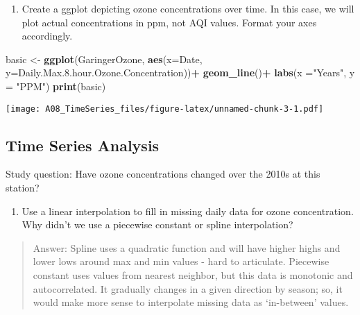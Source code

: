 \documentclass[
]{article}
\newenvironment{Shaded}{\begin{snugshade}}{\end{snugshade}}
\newcommand{\DataTypeTok}[1]{\textcolor[rgb]{0.13,0.29,0.53}{#1}}
\newcommand{\FloatTok}[1]{\textcolor[rgb]{0.00,0.00,0.81}{#1}}
\newcommand{\KeywordTok}[1]{\textcolor[rgb]{0.13,0.29,0.53}{\textbf{#1}}}
\newcommand{\NormalTok}[1]{#1}
\newcommand{\OperatorTok}[1]{\textcolor[rgb]{0.81,0.36,0.00}{\textbf{#1}}}
\newcommand{\StringTok}[1]{\textcolor[rgb]{0.31,0.60,0.02}{#1}}
\providecommand{\tightlist}{%
  \setlength{\itemsep}{0pt}\setlength{\parskip}{0pt}}
\begin{document}
\begin{enumerate}
\def\labelenumi{\arabic{enumi}.}
\setcounter{enumi}{6}
\tightlist
\item
  Create a ggplot depicting ozone concentrations over time. In this
  case, we will plot actual concentrations in ppm, not AQI values.
  Format your axes accordingly.
\end{enumerate}

\begin{Shaded}
\begin{Highlighting}[]
\NormalTok{basic <-}\StringTok{ }\KeywordTok{ggplot}\NormalTok{(GaringerOzone, }\KeywordTok{aes}\NormalTok{(}\DataTypeTok{x=}\NormalTok{Date, }\DataTypeTok{y=}\NormalTok{Daily.Max.}\FloatTok{8.}\NormalTok{hour.Ozone.Concentration))}\OperatorTok{+}
\StringTok{  }\KeywordTok{geom_line}\NormalTok{()}\OperatorTok{+}
\StringTok{  }\KeywordTok{labs}\NormalTok{(}\DataTypeTok{x =}\StringTok{"Years"}\NormalTok{, }\DataTypeTok{y =} \StringTok{"PPM"}\NormalTok{)}
\KeywordTok{print}\NormalTok{(basic)}
\end{Highlighting}
\end{Shaded}

\texttt{[image: A08\_TimeSeries\_files/figure-latex/unnamed-chunk-3-1.pdf]}

\hypertarget{time-series-analysis}{%
\subsection{Time Series Analysis}\label{time-series-analysis}}

Study question: Have ozone concentrations changed over the 2010s at this
station?

\begin{enumerate}
\def\labelenumi{\arabic{enumi}.}
\setcounter{enumi}{7}
\tightlist
\item
  Use a linear interpolation to fill in missing daily data for ozone
  concentration. Why didn't we use a piecewise constant or spline
  interpolation?
\end{enumerate}

\begin{quote}
Answer: Spline uses a quadratic function and will have higher highs and
lower lows around max and min values - hard to articulate. Piecewise
constant uses values from nearest neighbor, but this data is monotonic
and autocorrelated. It gradually changes in a given direction by season;
so, it would make more sense to interpolate missing data as `in-between'
values.
\end{quote}
\end{document}
